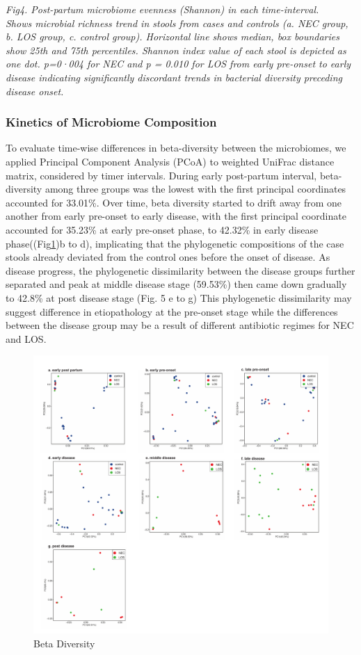 \documentclass[fleqn,10pt]{wlpeerj} %
\begin{document}
    \textit{Fig4. Post-partum microbiome evenness (Shannon) in each time-interval. \\ Shows microbial richness trend in stools from cases and controls (a. NEC group, b. LOS group, c. control group). Horizontal line shows median, box boundaries show 25th and 75th percentiles.  Shannon index value of each stool is depicted as one dot. p=0·004 for NEC and p = 0.010 for LOS from early pre-onset to early disease indicating significantly discordant trends in bacterial diversity preceding disease onset. }


    \subsubsection*{Kinetics of Microbiome Composition}
    To evaluate time-wise differences in beta-diversity between the microbiomes, we applied Principal Component Analysis (PCoA) to weighted UniFrac distance matrix, considered by timer intervals. During early post-partum interval, beta-diversity among three groups was the lowest with the first principal coordinates accounted for 33.01\%.
    Over time, beta diversity started to drift away from one another from early pre-onset to early disease, with the first principal coordinate accounted for 35.23\% at early pre-onset phase, to 42.32\% in early disease phase((Fig\ref{fig:pcoa})b to d), implicating that the phylogenetic compositions of the case stools already deviated from the control ones before the onset of disease. As disease progress, the phylogenetic dissimilarity between the disease groups further separated and peak at middle disease stage (59.53\%) then came down gradually to 42.8\% at post disease stage (Fig. 5 e to g)  This phylogenetic dissimilarity may suggest  difference in  etiopathology at the pre-onset stage while the differences between the disease group may be a result of different antibiotic regimes for NEC and LOS.
    \begin{figure}[ht]\centering
      \includegraphics[width=\linewidth]{figure/pcoa_time_group.pdf}
      \caption{Beta Diversity}
      \label{fig:pcoa}
    \end{figure}
\end{document}
